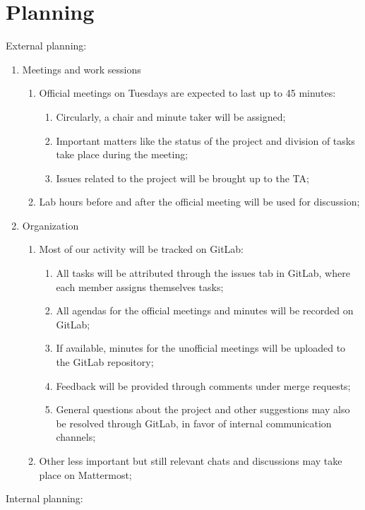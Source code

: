 \section{Planning}
External planning:
\begin{enumerate}
    \item Meetings and work sessions
    \begin{enumerate}
    \item Official meetings on Tuesdays are expected to last up to 45 minutes:
    \begin{enumerate}
        \item Circularly, a chair and minute taker will be assigned;
        \item Important matters like the status of the project and division of tasks take place during the meeting;
        \item Issues related to the project will be brought up to the TA;
    \end{enumerate}
    \item Lab hours before and after the official meeting will be used for discussion;
    \end{enumerate}
    \item Organization
    \begin{enumerate}
    \item Most of our activity will be tracked on GitLab:
    \begin{enumerate}
        \item All tasks will be attributed through the issues tab in GitLab, where each member assigns themselves tasks;
        \item All agendas for the official meetings and minutes will be recorded on GitLab;
        \item If available, minutes for the unofficial meetings will be uploaded to the GitLab repository;
        \item Feedback will be provided through comments under merge requests;
        \item General questions about the project and other suggestions may also be resolved through GitLab, in favor of internal communication channels;
    \end{enumerate}
    \item Other less important but still relevant chats and discussions may take place on Mattermost;
    \end{enumerate}
\end{enumerate}
Internal planning:
